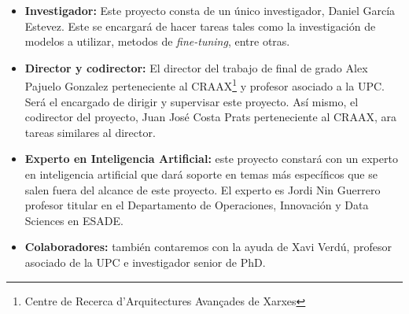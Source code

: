 \begin{itemize}
    \item \textbf{Investigador:} Este proyecto consta de un único investigador, Daniel García Estevez. Este se encargará de hacer tareas tales como la investigación de modelos a utilizar, 
                                 metodos de \textit{fine-tuning}, entre otras.
    \item \textbf{Director y codirector:} El director del trabajo de final de grado Alex Pajuelo Gonzalez perteneciente al CRAAX\footnote{Centre de Recerca d'Arquitectures Avançades de Xarxes}
                                        y profesor asociado a la UPC. Será el encargado de dirigir y supervisar este proyecto. Así mismo, el codirector del proyecto, Juan José Costa Prats
                                        perteneciente al CRAAX, ara tareas similares al director.
    \item \textbf{Experto en Inteligencia Artificial:} este proyecto constará con un experto en inteligencia artificial que dará soporte en temas más específicos que se salen fuera del alcance de
                                                    este proyecto. El experto es Jordi Nin Guerrero profesor titular en el Departamento de Operaciones, Innovación y Data Sciences en ESADE.
    \item \textbf{Colaboradores:} también contaremos con la ayuda de Xavi Verdú, profesor asociado de la UPC e investigador senior de PhD.
\end{itemize}